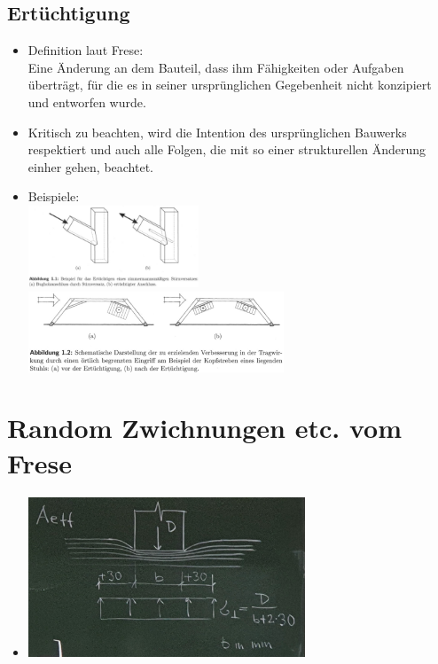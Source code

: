 \documentclass[fleqn,twoside]{article}
\begin{document}
 \subsection{Ertüchtigung}
    \begin{itemize}
        \item Definition laut Frese: \\
        Eine Änderung an dem Bauteil, dass ihm Fähigkeiten oder Aufgaben überträgt, für die es in seiner ursprünglichen Gegebenheit nicht konzipiert und entworfen wurde.
        \item Kritisch zu beachten, wird die Intention des ursprünglichen Bauwerks respektiert und auch alle Folgen, die mit so einer strukturellen Änderung einher gehen, beachtet.
        \item Beispiele:\\
            \includegraphics[width=0.4\textwidth]{Grafiken/Denkmalpflegerische Arbeit/Ertuechtigung 1.png}
            \includegraphics[width=0.6\textwidth]{Grafiken/Denkmalpflegerische Arbeit/Ertuechtigung 2.png}
    \end{itemize}
 
 
 \newpage
\section{Random Zwichnungen etc. vom Frese} 
 \begin{itemize}
    \item \includegraphics[width=0.65\textwidth]{Grafiken/Denkmalpflegerische Arbeit/Querpressung Holz.jpg}
 
 \end{itemize}
 
 
 
 
\end{document}
